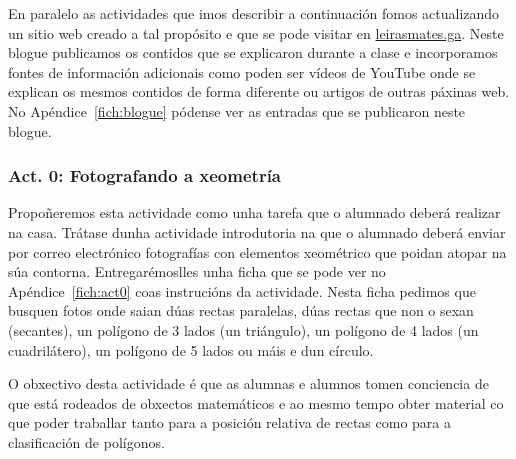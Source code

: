 En paralelo as actividades que imos describir a continuación fomos actualizando un sitio web creado a tal propósito e que se pode visitar en \href{http://leirasmates.ga}{leirasmates.ga}. Neste blogue publicamos os contidos que se explicaron durante a clase e incorporamos fontes de información adicionais como poden ser vídeos de YouTube onde se explican os mesmos contidos de forma diferente ou artigos de outras páxinas web. No Apéndice~\ref{fich:blogue} pódense ver as entradas que se publicaron neste blogue.

\subsubsection{Act. 0: Fotografando a xeometría}\label{act0}

Propoñeremos esta actividade como unha tarefa que o alumnado deberá realizar na casa. Trátase dunha actividade introdutoria na que o alumnado deberá enviar por correo electrónico fotografías con elementos xeométrico que poidan atopar na súa contorna. Entregarémoslles unha ficha que se pode ver no  Apéndice~\ref{fich:act0} coas instrucións da actividade. Nesta ficha pedimos que busquen fotos onde saian dúas rectas paralelas, dúas rectas que non o sexan (secantes), un polígono de 3 lados (un triángulo), un polígono de 4 lados (un cuadrilátero), un polígono de 5 lados ou máis e dun círculo.

O obxectivo desta actividade é que as alumnas e alumnos tomen conciencia de que está rodeados de obxectos matemáticos e ao mesmo tempo obter material co que poder traballar tanto para a posición relativa de rectas como para a clasificación de polígonos.

